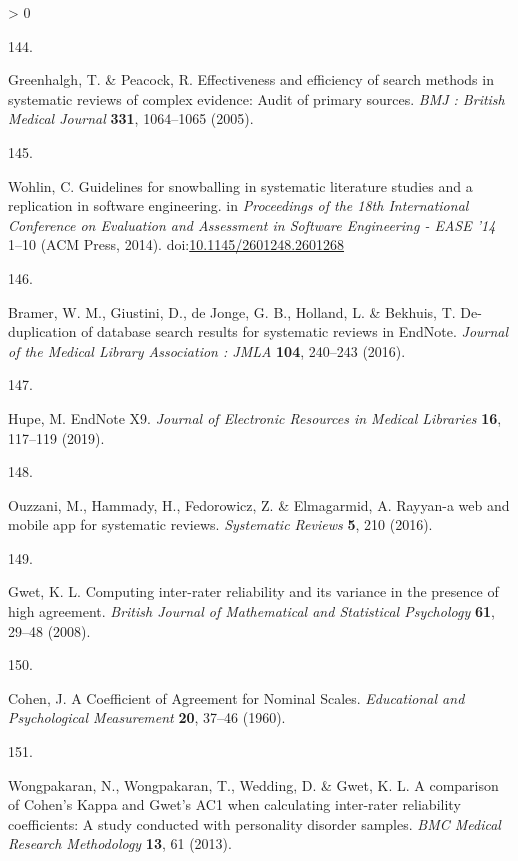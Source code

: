 \documentclass[a4paper, twoside]{templates/ociamthesis}
\newlength{\cslhangindent}
\newlength{\csllabelwidth}
\newenvironment{CSLReferences}[3] %
 {%
  \setlength{\parindent}{0pt}
  \ifodd #1 \everypar{\setlength{\hangindent}{\cslhangindent}}\ignorespaces\fi
  \ifnum #2 > 0
  \setlength{\parskip}{#2\baselineskip}
  \fi
 }%
 {}
\newcommand{\CSLLeftMargin}[1]{\parbox[t]{\maxof{\widthof{#1}}{\csllabelwidth}}{#1}}
\newcommand{\CSLRightInline}[1]{\parbox[t]{\linewidth - \csllabelwidth}{#1}}
\begin{document}
\begin{CSLReferences}{0}{0}
\leavevmode\hypertarget{ref-greenhalgh2005}{}%
\CSLLeftMargin{144. }
\CSLRightInline{Greenhalgh, T. \& Peacock, R. Effectiveness and efficiency of search methods in systematic reviews of complex evidence: Audit of primary sources. \emph{BMJ : British Medical Journal} \textbf{331}, 1064--1065 (2005).}

\leavevmode\hypertarget{ref-wohlin2014}{}%
\CSLLeftMargin{145. }
\CSLRightInline{Wohlin, C. Guidelines for snowballing in systematic literature studies and a replication in software engineering. in \emph{Proceedings of the 18th {International Conference} on {Evaluation} and {Assessment} in {Software Engineering} - {EASE} '14} 1--10 ({ACM Press}, 2014). doi:\href{https://doi.org/10.1145/2601248.2601268}{10.1145/2601248.2601268}}

\leavevmode\hypertarget{ref-bramer2016}{}%
\CSLLeftMargin{146. }
\CSLRightInline{Bramer, W. M., Giustini, D., de Jonge, G. B., Holland, L. \& Bekhuis, T. De-duplication of database search results for systematic reviews in {EndNote}. \emph{Journal of the Medical Library Association : JMLA} \textbf{104}, 240--243 (2016).}

\leavevmode\hypertarget{ref-hupe2019}{}%
\CSLLeftMargin{147. }
\CSLRightInline{Hupe, M. {EndNote X9}. \emph{Journal of Electronic Resources in Medical Libraries} \textbf{16}, 117--119 (2019).}

\leavevmode\hypertarget{ref-ouzzani2016}{}%
\CSLLeftMargin{148. }
\CSLRightInline{Ouzzani, M., Hammady, H., Fedorowicz, Z. \& Elmagarmid, A. Rayyan-a web and mobile app for systematic reviews. \emph{Systematic Reviews} \textbf{5}, 210 (2016).}

\leavevmode\hypertarget{ref-gwet2008}{}%
\CSLLeftMargin{149. }
\CSLRightInline{Gwet, K. L. Computing inter-rater reliability and its variance in the presence of high agreement. \emph{British Journal of Mathematical and Statistical Psychology} \textbf{61}, 29--48 (2008).}

\leavevmode\hypertarget{ref-cohen1960}{}%
\CSLLeftMargin{150. }
\CSLRightInline{Cohen, J. A {Coefficient} of {Agreement} for {Nominal Scales}. \emph{Educational and Psychological Measurement} \textbf{20}, 37--46 (1960).}

\leavevmode\hypertarget{ref-wongpakaran2013}{}%
\CSLLeftMargin{151. }
\CSLRightInline{Wongpakaran, N., Wongpakaran, T., Wedding, D. \& Gwet, K. L. A comparison of {Cohen}'s {Kappa} and {Gwet}'s {AC1} when calculating inter-rater reliability coefficients: A study conducted with personality disorder samples. \emph{BMC Medical Research Methodology} \textbf{13}, 61 (2013).}


\end{CSLReferences}
\end{document}
